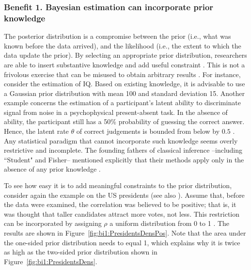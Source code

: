 \subsubsection{Benefit 1. Bayesian estimation can incorporate prior knowledge}
The posterior distribution is a compromise between the prior (i.e., what was known before the data arrived), and the likelihood (i.e., the extent to which the data update the prior). By selecting an appropriate prior distribution, researchers are able to insert substantive knowledge and add useful constraint \cite{Vanpaemel2010,VanpaemelLee2012}. This is not a frivolous exercise that can be misused to obtain arbitrary results \cite{Lindley2004}. For instance, consider the estimation of IQ. Based on existing knowledge, it is advisable to use a Gaussian prior distribution with mean 100 and standard deviation 15. Another example concerns the estimation of a participant's latent ability to discriminate signal from noise in a psychophysical present-absent task. In the absence of ability, the participant still has a 50\% probability of guessing the correct answer. Hence, the latent rate $\theta$ of correct judgements is bounded from below by $0.5$ \cite{MoreyEtAl2008b,RouderEtAl2007MAC}. Any statistical paradigm that cannot incorporate such knowledge seems overly restrictive and incomplete. The founding fathers of classical inference --including ``Student" and Fisher-- mentioned explicitly that their methods apply only in the absence of any prior knowledge \cite[pp. 380-382]{Jeffreys1961}.

To see how easy it is to add meaningful constraints to the prior distribution, consider again the example on the US presidents (see also ). Assume that, before the data were examined, the correlation was believed to be positive; that is, it was thought that taller candidates attract more votes, not less. This restriction can be incorporated by assigning $\rho$ a uniform distribution from 0 to 1 \cite{HoijtinkEtAl2008,HoijtinkEtAl2011,KlugkistEtAl2005a}. The results are shown in Figure~\ref{fig:bi1:PresidentsDensPos}. Note that the area under the one-sided prior distribution needs to equal 1, which explains why it is twice as high as the two-sided prior distribution shown in Figure~\ref{fig:bi1:PresidentsDens}.

